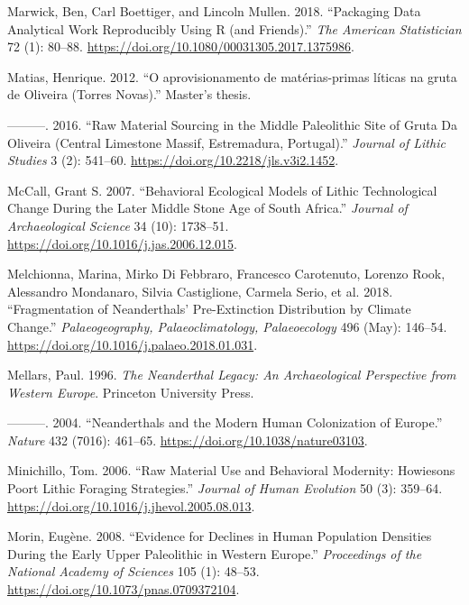 \documentclass[
  a4paper,
  DIV=11,
  numbers=noendperiod]{scrreprt}
\newlength{\cslhangindent}
\newenvironment{CSLReferences}[2] %
 {\begin{list}{}{%
  \setlength{\itemindent}{0pt}
  \setlength{\leftmargin}{0pt}
  \setlength{\parsep}{0pt}
  \ifodd #1
   \setlength{\leftmargin}{\cslhangindent}
   \setlength{\itemindent}{-1\cslhangindent}
  \fi
  \setlength{\itemsep}{#2\baselineskip}}}
 {\end{list}}
\begin{document}
\begin{CSLReferences}{1}{0}
Marwick, Ben, Carl Boettiger, and Lincoln Mullen. 2018. {``Packaging
{Data Analytical Work Reproducibly Using R} (and {Friends}).''}
\emph{The American Statistician} 72 (1): 80--88.
\url{https://doi.org/10.1080/00031305.2017.1375986}.

Matias, Henrique. 2012. {``{O aprovisionamento de mat{é}rias-primas
l{í}ticas na gruta de Oliveira (Torres Novas)}.''} Master's thesis.

---------. 2016. {``Raw Material Sourcing in the {Middle Paleolithic}
Site of {Gruta} Da {Oliveira} ({Central Limestone Massif},
{Estremadura}, {Portugal}).''} \emph{Journal of Lithic Studies} 3 (2):
541--60. \url{https://doi.org/10.2218/jls.v3i2.1452}.

McCall, Grant S. 2007. {``Behavioral Ecological Models of Lithic
Technological Change During the Later {Middle Stone Age} of {South
Africa}.''} \emph{Journal of Archaeological Science} 34 (10): 1738--51.
\url{https://doi.org/10.1016/j.jas.2006.12.015}.

Melchionna, Marina, Mirko Di Febbraro, Francesco Carotenuto, Lorenzo
Rook, Alessandro Mondanaro, Silvia Castiglione, Carmela Serio, et al.
2018. {``Fragmentation of {Neanderthals}' Pre-Extinction Distribution by
Climate Change.''} \emph{Palaeogeography, Palaeoclimatology,
Palaeoecology} 496 (May): 146--54.
\url{https://doi.org/10.1016/j.palaeo.2018.01.031}.

Mellars, Paul. 1996. \emph{The {Neanderthal Legacy}: {An Archaeological
Perspective} from {Western Europe}}. Princeton University Press.

---------. 2004. {``Neanderthals and the Modern Human Colonization of
{Europe}.''} \emph{Nature} 432 (7016): 461--65.
\url{https://doi.org/10.1038/nature03103}.

Minichillo, Tom. 2006. {``Raw Material Use and Behavioral Modernity:
{Howiesons Poort} Lithic Foraging Strategies.''} \emph{Journal of Human
Evolution} 50 (3): 359--64.
\url{https://doi.org/10.1016/j.jhevol.2005.08.013}.

Morin, Eugène. 2008. {``Evidence for Declines in Human Population
Densities During the Early Upper Paleolithic in Western Europe.''}
\emph{Proceedings of the National Academy of Sciences} 105 (1): 48--53.
\url{https://doi.org/10.1073/pnas.0709372104}.


\end{CSLReferences}
\end{document}
